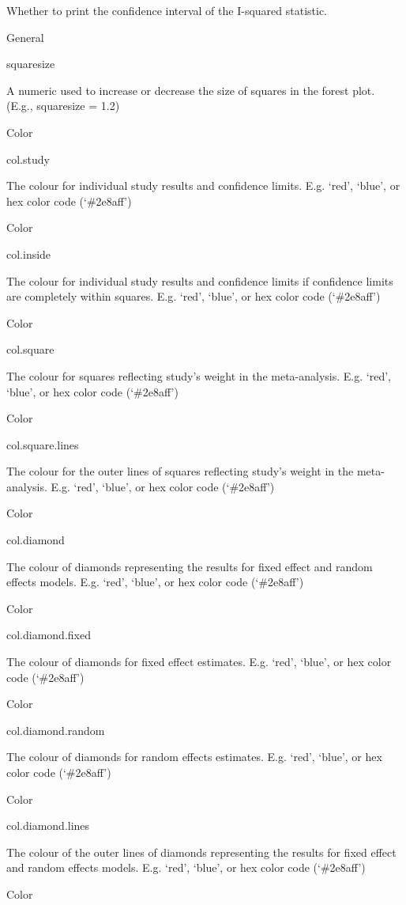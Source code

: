 \documentclass[]{book}
\begin{document}
Whether to print the confidence interval of the I-squared statistic.

General

squaresize

A numeric used to increase or decrease the size of squares in the forest plot. (E.g., squaresize = 1.2)

Color

col.study

The colour for individual study results and confidence limits. E.g. `red', `blue', or hex color code (`\#2e8aff')

Color

col.inside

The colour for individual study results and confidence limits if confidence limits are completely within squares. E.g. `red', `blue', or hex color code (`\#2e8aff')

Color

col.square

The colour for squares reflecting study's weight in the meta-analysis. E.g. `red', `blue', or hex color code (`\#2e8aff')

Color

col.square.lines

The colour for the outer lines of squares reflecting study's weight in the meta-analysis. E.g. `red', `blue', or hex color code (`\#2e8aff')

Color

col.diamond

The colour of diamonds representing the results for fixed effect and random effects models. E.g. `red', `blue', or hex color code (`\#2e8aff')

Color

col.diamond.fixed

The colour of diamonds for fixed effect estimates. E.g. `red', `blue', or hex color code (`\#2e8aff')

Color

col.diamond.random

The colour of diamonds for random effects estimates. E.g. `red', `blue', or hex color code (`\#2e8aff')

Color

col.diamond.lines

The colour of the outer lines of diamonds representing the results for fixed effect and random effects models. E.g. `red', `blue', or hex color code (`\#2e8aff')

Color
\end{document}
